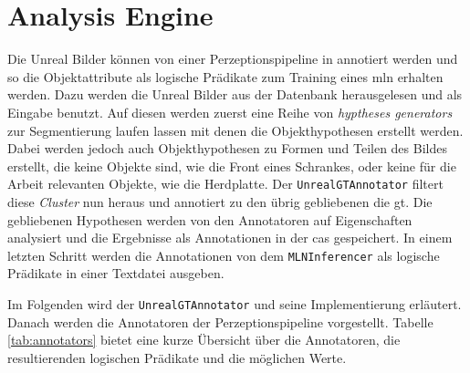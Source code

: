 \section{Analysis Engine}
\label{sec:analysisengine}
Die Unreal Bilder können  von einer Perzeptionspipeline in \robosherlock annotiert werden und so die Objektattribute als logische Prädikate zum Training eines \gls{mln} erhalten werden. Dazu werden die Unreal Bilder aus der Datenbank herausgelesen und als Eingabe benutzt. Auf diesen werden zuerst eine Reihe von \textit{hyptheses generators} zur Segmentierung laufen lassen mit denen die Objekthypothesen erstellt werden. Dabei werden jedoch auch Objekthypothesen zu Formen und Teilen des Bildes erstellt, die keine Objekte sind, wie die Front eines Schrankes, oder keine für die Arbeit relevanten Objekte, wie die Herdplatte. Der \texttt{UnrealGTAnnotator} filtert diese \textit{Cluster} nun heraus und annotiert zu den übrig gebliebenen die \gls{gt}. Die gebliebenen Hypothesen werden von den Annotatoren auf Eigenschaften analysiert und die Ergebnisse als Annotationen in der \gls{cas} gespeichert. In einem letzten Schritt werden die Annotationen von dem \texttt{MLNInferencer} als logische Prädikate in einer Textdatei ausgeben. \par 

Im Folgenden wird der \texttt{UnrealGTAnnotator} und seine Implementierung erläutert. Danach werden die Annotatoren der Perzeptionspipeline vorgestellt. Tabelle \ref{tab:annotators} bietet eine kurze Übersicht über die Annotatoren, die resultierenden logischen Prädikate und die möglichen Werte.

